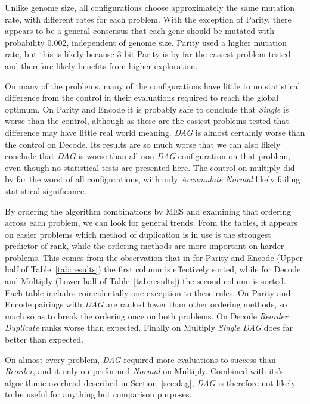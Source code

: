 \documentclass[journal]{IEEEtran}
\begin{document}
Unlike genome size, all configurations choose approximately the same mutation rate,
with different rates for each problem.  With the exception of Parity, there appears
to be a general consensus that each gene should be mutated with probability 0.002,
independent of genome size.  Parity used a higher mutation rate, but this is likely
because 3-bit Parity is by far the easiest problem tested and therefore likely benefits
from higher exploration.

On many of the problems, many of the configurations have little to no statistical
difference from the control in their evaluations required to reach the global optimum.
On Parity and Encode it is probably safe to conclude that \emph{Single} is worse than
the control, although as these are the easiest problems tested that difference may have
little real world meaning.  \emph{DAG} is almost certainly worse than the control on
Decode.  Its results are so much worse that we can also likely conclude that \emph{DAG}
is worse than all non \emph{DAG} configuration on that problem, even though no statistical
tests are presented here.  The control on multiply did by far the worst of all configurations,
with only \emph{Accumulate Normal} likely failing statistical significance.

By ordering the algorithm combinations by MES and examining that ordering across each
problem, we can look for general trends.  From the tables, it appears on easier problems
which method of duplication is in use is the strongest predictor of rank, while
the ordering methods are more important on harder problems.  This comes from the
observation that in for Parity and Encode (Upper half of Table~\ref{tab:results})
the first column is effectively sorted, while for Decode and Multiply
(Lower half of Table~\ref{tab:results})
the second column is sorted.
Each table includes coincidentally one exception to these rules.  On Parity and
Encode pairings with \emph{DAG} are ranked lower than other ordering methods, so much
so as to break the ordering once on both problems.  On Decode \emph{Reorder Duplicate}
ranks worse than expected.  Finally on Multiply \emph{Single DAG} does far better
than expected.

On almost every problem, \emph{DAG} required
more evaluations to success than \emph{Reorder}, and it only outperformed \emph{Normal}
on Multiply.  Combined with its's algorithmic overhead described in
Section~\ref{sec:dag}, \emph{DAG} is therefore not likely to be useful for anything
but comparison purposes.
\end{document}

